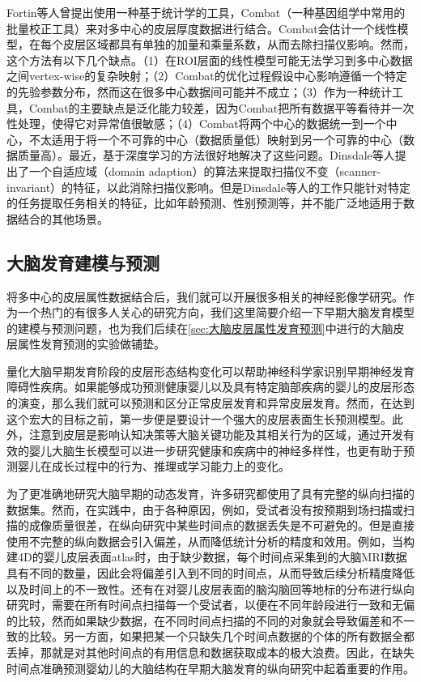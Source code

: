 Fortin等人\cite{fortin2018harmonization}曾提出使用一种基于统计学的工具，Combat（一种基因组学中常用的批量校正工具）来对多中心的皮层厚度数据进行结合。Combat会估计一个线性模型，在每个皮层区域都具有单独的加量和乘量系数，从而去除扫描仪影响。然而，这个方法有以下几个缺点。（1）在ROI层面的线性模型可能无法学习到多中心数据之间vertex-wise的复杂映射；（2）Combat的优化过程假设中心影响遵循一个特定的先验参数分布，然而这在很多中心数据间可能并不成立；（3）作为一种统计工具，Combat的主要缺点是泛化能力较差，因为Combat把所有数据平等看待并一次性处理，使得它对异常值很敏感；（4）Combat将两个中心的数据统一到一个中心，不太适用于将一个不可靠的中心（数据质量低）映射到另一个可靠的中心（数据质量高）。最近，基于深度学习的方法很好地解决了这些问题。Dinsdale\cite{dinsdale2020unlearning}等人提出了一个自适应域（domain adaption）的算法来提取扫描仪不变（scanner-invariant）的特征，以此消除扫描仪影响。但是Dinsdale等人\cite{dinsdale2020unlearning}的工作只能针对特定的任务提取任务相关的特征，比如年龄预测、性别预测等，并不能广泛地适用于数据结合的其他场景。

\subsection{大脑发育建模与预测}
将多中心的皮层属性数据结合后，我们就可以开展很多相关的神经影像学研究。作为一个热门的有很多人关心的研究方向，我们这里简要介绍一下早期大脑发育模型的建模与预测问题，也为我们后续在\ref{sec:大脑皮层属性发育预测}中进行的大脑皮层属性发育预测的实验做铺垫。

量化大脑早期发育阶段的皮层形态结构变化可以帮助神经科学家识别早期神经发育障碍性疾病。如果能够成功预测健康婴儿以及具有特定脑部疾病的婴儿的皮层形态的演变，那么我们就可以预测和区分正常皮层发育和异常皮层发育。然而，在达到这个宏大的目标之前，第一步便是要设计一个强大的皮层表面生长预测模型。此外，注意到皮层是影响认知决策等大脑关键功能及其相关行为的区域，通过开发有效的婴儿大脑生长模型可以进一步研究健康和疾病中的神经多样性，也更有助于预测婴儿在成长过程中的行为、推理或学习能力上的变化\cite{gilmore2007regional}。

为了更准确地研究大脑早期的动态发育，许多研究都使用了具有完整的纵向扫描的数据集。然而，在实践中，由于各种原因，例如，受试者没有按预期到场扫描或扫描的成像质量很差，在纵向研究中某些时间点的数据丢失是不可避免的。但是直接使用不完整的纵向数据会引入偏差，从而降低统计分析的精度和效用。例如，当构建4D的婴儿皮层表面atlas时，由于缺少数据，每个时间点采集到的大脑MRI数据具有不同的数量\cite{wu2019construction}，因此会将偏差引入到不同的时间点，从而导致后续分析精度降低以及时间上的不一致性。还有在对婴儿皮层表面的脑沟脑回等地标的分布进行纵向研究时\cite{duan2019exploring}，需要在所有时间点扫描每一个受试者，以便在不同年龄段进行一致和无偏的比较，然而如果缺少数据，在不同时间点扫描的不同的对象就会导致偏差和不一致的比较。另一方面，如果把某一个只缺失几个时间点数据的个体的所有数据全都丢掉，那就是对其他时间点的有用信息和数据获取成本的极大浪费。因此，在缺失时间点准确预测婴幼儿的大脑结构在早期大脑发育的纵向研究中起着重要的作用\cite{meng2017can}。

